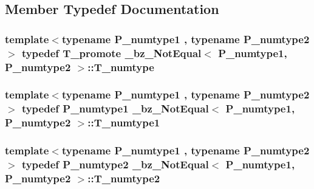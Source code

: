 \subsection{Member Typedef Documentation}
\hypertarget{class__bz__NotEqual_a27a166792b382a657c782168a32be651}{}
\subsubsection[{T\+\_\+numtype}]{\setlength{\rightskip}{0pt plus 5cm}template$<$typename P\+\_\+numtype1 , typename P\+\_\+numtype2 $>$ typedef {\bf T\+\_\+promote} {\bf \+\_\+bz\+\_\+\+Not\+Equal}$<$ P\+\_\+numtype1, P\+\_\+numtype2 $>$\+::{\bf T\+\_\+numtype}}\label{class__bz__NotEqual_a27a166792b382a657c782168a32be651}
\hypertarget{class__bz__NotEqual_a465bf93f3414ff7781b00e8c595aaa70}{}
\subsubsection[{T\+\_\+numtype1}]{\setlength{\rightskip}{0pt plus 5cm}template$<$typename P\+\_\+numtype1 , typename P\+\_\+numtype2 $>$ typedef P\+\_\+numtype1 {\bf \+\_\+bz\+\_\+\+Not\+Equal}$<$ P\+\_\+numtype1, P\+\_\+numtype2 $>$\+::{\bf T\+\_\+numtype1}}\label{class__bz__NotEqual_a465bf93f3414ff7781b00e8c595aaa70}
\hypertarget{class__bz__NotEqual_adc1ba7b55abe2073c13aefa8c201ac03}{}
\subsubsection[{T\+\_\+numtype2}]{\setlength{\rightskip}{0pt plus 5cm}template$<$typename P\+\_\+numtype1 , typename P\+\_\+numtype2 $>$ typedef P\+\_\+numtype2 {\bf \+\_\+bz\+\_\+\+Not\+Equal}$<$ P\+\_\+numtype1, P\+\_\+numtype2 $>$\+::{\bf T\+\_\+numtype2}}\label{class__bz__NotEqual_adc1ba7b55abe2073c13aefa8c201ac03}
\hypertarget{class__bz__NotEqual_a4674656940422bb8f41fc717c70e185c}{}
